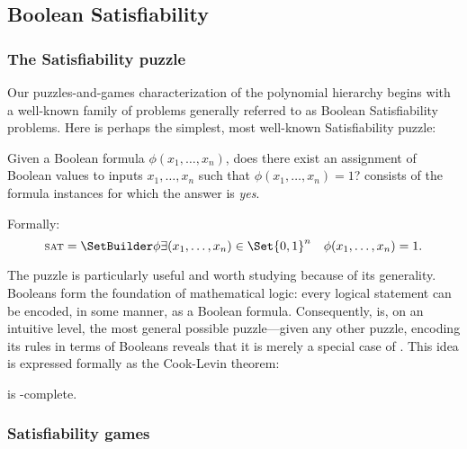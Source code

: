 \subsection{Boolean Satisfiability}

\subsubsection{The Satisfiability puzzle}


Our puzzles-and-games characterization of the polynomial hierarchy begins with
a well-known family of problems generally referred to as Boolean Satisfiability
problems.  Here is perhaps the simplest, most well-known Satisfiability puzzle:

\begin{definition}%
  Given a Boolean formula \(\phi(x_1, \dots, x_n)\), does there exist an
  assignment of Boolean values to inputs \(x_1, \dots, x_n\) such that
  \(\phi(x_1, \dots, x_n) = 1\)?   consists of the formula
  instances for which the answer is \emph{yes}.

  Formally:
  \[
    \Problem{sat} = \SetBuilder \phi {
      \exists (x_1, \dots, x_n) \in \Set{0,1}^n \quad \phi(x_1, \dots, x_n) = 1
    }.
  \]
\end{definition}

The \SAT{} puzzle is particularly useful and worth studying because of its
generality.  Booleans form the foundation of mathematical logic: every logical
statement can be encoded, in some manner, as a Boolean formula.  Consequently,
\SAT{} is, on an intuitive level, the most general possible puzzle---given any
other puzzle, encoding its rules in terms of Booleans reveals that it is merely
a special case of \SAT.  This idea is expressed formally as the Cook-Levin
theorem:

\begin{theorem}
  \SAT{} is \NP-complete.
\end{theorem}


\subsubsection{Satisfiability games}

